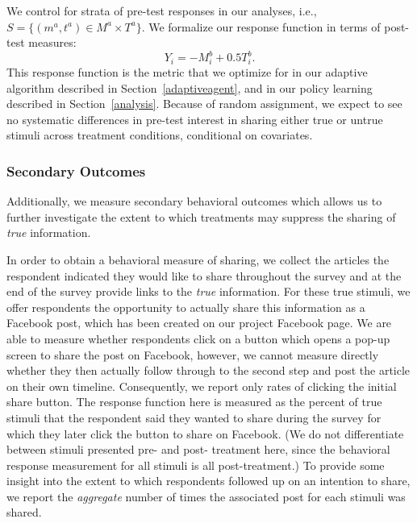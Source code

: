 \documentclass[letterpaper, 12pt, parskip=full,DIV=10]{scrartcl}
\begin{document}
We control for strata of pre-test responses in our analyses, i.e., $S=\{(m^a, t^a)\in M^a \times T^a\}$. 
We formalize our response function in terms of post-test measures:
\[
Y_i = -M^b_i + 0.5 T^b_i.
\]
This response function is the metric that we optimize for in our adaptive algorithm described in Section~\ref{adaptiveagent}, and in our policy learning described in Section~\ref{analysis}. Because of random assignment, we expect to see no systematic differences in pre-test interest in sharing either true or untrue stimuli across treatment conditions, conditional on covariates. %




\subsubsection{Secondary Outcomes}
Additionally, we measure secondary behavioral outcomes which allows us to further investigate the extent to which treatments may suppress the sharing of \textit{true} information.

In order to obtain a behavioral measure of sharing, we collect the articles the respondent indicated they would like to share throughout the survey and at the end of the survey provide links to the \textit{true} information. For these true stimuli, we offer respondents the opportunity to actually share this information as a Facebook post, which has been created on our project Facebook page. We are able to measure whether respondents click on a button which opens a pop-up screen to share the post on Facebook, however, we cannot measure directly whether they then actually follow through to the second step and post the article on their own timeline. Consequently, we report only rates of clicking the initial share button. The response function here is measured as the percent of true stimuli that the respondent said they wanted to share during the survey for which they later click the button to share on Facebook. (We do not differentiate between stimuli presented pre- and post- treatment here, since the behavioral response measurement for all stimuli is all post-treatment.) To provide some insight into the extent to which respondents followed up on an intention to share, we report the \textit{aggregate} number of times the associated post for each stimuli was shared. %
\end{document}
